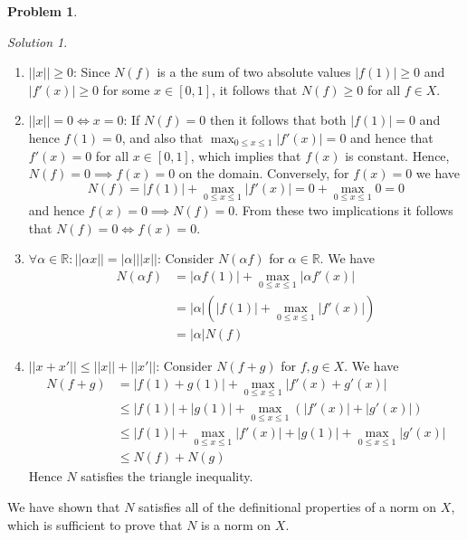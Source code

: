 \documentclass[12pt,a4paper]{article}
\theoremstyle{definition}
\newtheorem{problem}{Problem}
\theoremstyle{remark}
\newtheorem*{solution}{Solution}
\begin{document}
\begin{problem}
\begin{enumerate}
\begin{solution}
            \begin{enumerate}
                \item $||x|| \ge 0$: Since $N(f)$ is a the sum of two absolute values $|f(1)| \ge 0$ and $|f'(x)| \ge 0$ for some $x \in [0,1]$, it follows that $N(f) \ge 0$ for all $f \in X$. 
                \item $||x||=0 \Leftrightarrow x=0$: If $N(f) =0$ then it follows that both $|f(1)| = 0$ and hence $f(1)=0$, and also that $\max_{0 \le x \le 1} |f'(x)| = 0$ and hence that $f'(x) =0$ for all $x \in [0,1]$, which implies that $f(x)$ is constant. Hence, $N(f) =0 \implies f(x)=0$ on the domain. Conversely, for $f(x)=0$ we have $$N(f) = |f(1)| + \max_{0 \le x \le 1} |f'(x)| = 0 + \max_{0 \le x \le 1} 0 =0$$
                and hence $f(x) =0 \implies N(f) =0$. From these two implications it follows that $N(f) = 0 \Leftrightarrow f(x) =0$. 
                \item $\forall \alpha \in \mathbb R : ||\alpha x|| = |\alpha| ||x||$: Consider $N(\alpha f)$ for $\alpha \in \mathbb R$. We have 
                \begin{align*}
                    N(\alpha f) &= |\alpha f(1)| + \max_{0 \le x \le 1} |\alpha f'(x)| \\
                    &= |\alpha|\left(|f(1)| + \max_{0 \le x \le 1} |f'(x)|\right) \\
                    &= |\alpha| N(f)
                \end{align*}
                \item $||x+x'|| \le ||x|| + ||x'||$: Consider $N(f+g)$ for $f, g \in X$. We have 
                \begin{align*}
                    N(f+g) &= |f(1)+g(1)| + \max_{0 \le x \le 1} |f'(x) + g'(x)| \\
                    &\le |f(1)| + |g(1)| + \max_{0 \le x \le 1} \left(|f'(x)| + |g'(x)|\right)\\
                    &\le |f(1)| + \max_{0 \le x \le 1} |f'(x)| + |g(1)| + \max_{0 \le x \le 1} |g'(x)| \\
                    &\le N(f) + N(g)
                \end{align*}
                Hence $N$ satisfies the triangle inequality.
            \end{enumerate}
            We have shown that $N$ satisfies all of the definitional properties of a norm on $X$, which is sufficient to prove that $N$ is a norm on $X$.
        \end{solution}
    \end{enumerate}
\end{problem}
\end{document}
